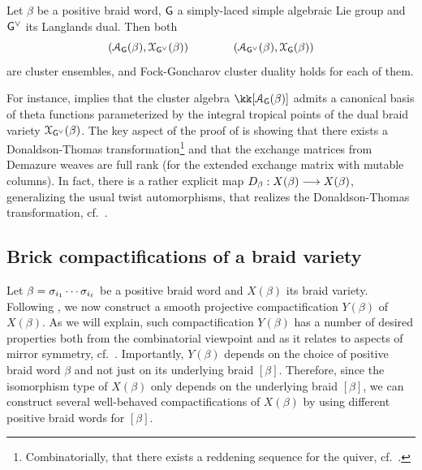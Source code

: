 \begin{theorem}\label{thm:fock_goncharov_duality} Let $\beta$ be a positive braid word, $\mathsf{G}$ a simply-laced simple algebraic Lie group and $\mathsf{G}^\vee$ its Langlands dual. Then both
\begin{equation}\label{eq:cluster_ensembles}
(\mathcal{A}_{\mathsf{G}}(\beta),\mathcal{X}_{\mathsf{G}^\vee}(\beta))\qquad\qquad (\mathcal{A}_{\mathsf{G}^\vee}(\beta),\mathcal{X}_{\mathsf{G}}(\beta))
\end{equation}
are cluster ensembles, and Fock-Goncharov cluster duality holds for each of them.\sbs
\end{theorem}

\noindent For instance,  implies that the cluster algebra $\kk[\SA_\G(\beta)]$ admits a canonical basis of theta
functions parameterized by the integral tropical points of the dual braid variety $\mathcal{X}_{\mathsf{G}^\vee}(\beta)$. The key aspect of the proof of  is showing that there exists a Donaldson-Thomas transformation\footnote{Combinatorially, that there exists a reddening sequence for the quiver, cf.~\cite{Keller2017_DT,Keller12_DT2}.} and that the exchange matrices from Demazure weaves are full rank (for the extended exchange matrix with mutable columns). In fact, there is a rather explicit map $D_\beta:X(\beta)\longrightarrow X(\beta)$, generalizing the usual twist automorphisms, that realizes the Donaldson-Thomas transformation, cf.~\cite[Theorem 8.7]{CGGLSS25}.

\subsection{Brick compactifications of a braid variety}\label{ssec:brick_compactifications} Let $\beta=\sigma_{i_1}\cdots\sigma_{i_\ell}$ be a positive braid word and $X(\beta)$ its braid variety. Following \cite[Section 4]{CGGS2}, we now construct a smooth projective compactification $Y(\beta)$ of $X(\beta)$. As we will explain, such compactification $Y(\beta)$ has a number of desired properties both from the combinatorial viewpoint and as it relates to aspects of mirror symmetry, cf.~. Importantly, $Y(\beta)$ depends on the choice of positive braid word $\beta$ and not just on its underlying braid $[\beta]$. Therefore, since the isomorphism type of $X(\beta)$ only depends on the underlying braid $[\beta]$, we can construct several well-behaved compactifications of $X(\beta)$ by using different positive braid words for $[\beta]$.\\

